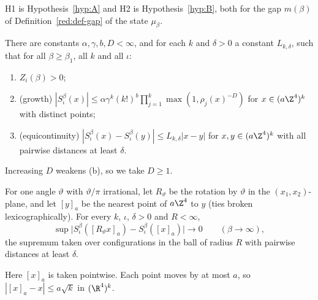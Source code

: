 H1 is Hypothesis~\ref{hyp:A} and H2 is Hypothesis~\ref{hyp:B}, both for the gap $m(\beta)$ of Definition~\ref{red:def-gap} of the state $\mu_\beta$.

\begin{hypothesis}\label{hyp:H3}
There are constants $\alpha,\gamma,b,D<\infty$, and for each $k$ and $\delta>0$ a constant $L_{k,\delta}$, such that for all $\beta\ge\beta_1$, all $k$ and all $\iota$:
\begin{enumerate}
\item[(a)] $Z_i(\beta)>0$;
\item[(b)] (growth) $|S^\beta_\iota(x)|\le\alpha\gamma^k(k!)^b\prod_{j=1}^k\max(1,\rho_j(x)^{-D})$ for $x\in(a\Z^4)^k$ with distinct points;
\item[(c)] (equicontinuity) $|S^\beta_\iota(x)-S^\beta_\iota(y)|\le L_{k,\delta}|x-y|$ for $x,y\in(a\Z^4)^k$ with all pairwise distances at least $\delta$.
\end{enumerate}
\end{hypothesis}

Increasing $D$ weakens (b), so we take $D\ge1$.

\begin{hypothesis}\label{hyp:H4}
For one angle $\vartheta$ with $\vartheta/\pi$ irrational, let $R_\vartheta$ be the rotation by $\vartheta$ in the $(x_1,x_2)$-plane, and let $[y]_a$ be the nearest point of $a\Z^4$ to $y$ (ties broken lexicographically). For every $k$, $\iota$, $\delta>0$ and $R<\infty$,
\[
  \sup\bigl|S^\beta_\iota([R_\vartheta x]_a)-S^\beta_\iota([x]_a)\bigr|\to0\qquad(\beta\to\infty),
\]
the supremum taken over configurations in the ball of radius $R$ with pairwise distances at least $\delta$.
\end{hypothesis}

Here $[x]_a$ is taken pointwise. Each point moves by at most $a$, so $|[x]_a-x|\le a\sqrt k$ in $(\R^4)^k$.

